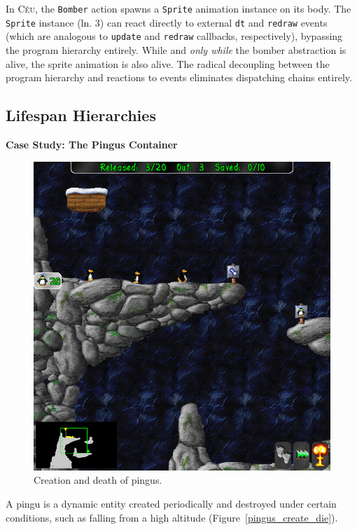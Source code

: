 \documentclass{vgtc}                          %
\newcommand{\CEU}{\textsc{C\'{e}u}\xspace}
\newcommand{\code}[1] {{\small{\texttt{#1}}}}
\begin{document}
In \CEU, the \code{Bomber} action spawns a \code{Sprite} animation instance on
its body.
%
The \code{Sprite} instance (ln. 3) can react directly to external \code{dt} and
\code{redraw} events (which are analogous to \code{update} and \code{redraw}
callbacks, respectively), bypassing the program hierarchy entirely.
While and \emph{only while} the bomber abstraction is alive, the sprite
animation is also alive.
The radical decoupling between the program hierarchy and reactions to events
eliminates dispatching chains entirely.

\subsection{Lifespan Hierarchies}

\textbf{Case Study: The Pingus Container}

\begin{figure}[t]
\centering
\includegraphics[width=\columnwidth]{pingus_create_die-anim}
\caption{Creation and death of pingus.
\label{fig.pingus_create_die}
}
\end{figure}

A pingu is a dynamic entity created periodically and destroyed under certain
conditions, such as falling from a high altitude
(Figure~\ref{pingus_create_die}).
\end{document}
